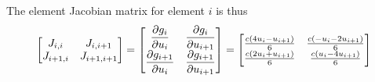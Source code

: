 The element Jacobian matrix for element $i$ is thus
\begin{equation}
  \begin{bmatrix}
    J_{i,i} & J_{i,i+1} \\
    J_{i+1,i} & J_{i+1,i+1} 
  \end{bmatrix} = \begin{bmatrix}
     \dfrac{\partial g_{i}}{\partial u_{i}}  &  \dfrac{\partial g_{i}}{\partial u_{i+1}}  \\
     \dfrac{\partial g_{i+1}}{\partial u_{i}}  &  \dfrac{\partial g_{i+1}}{\partial u_{i+1}} 
   \end{bmatrix} = \begin{bmatrix}
    \frac{c\left( 4 u_{i}-u_{i+1} \right)}{6} & \frac{c\left( -u_{i}-2 u_{i+1} \right)}{6} \\
    \frac{c\left( 2 u_{i}+u_{i+1} \right)}{6} & \frac{c\left( u_{i}-4u_{i+1} \right)}{6}
   \end{bmatrix}
\end{equation}

